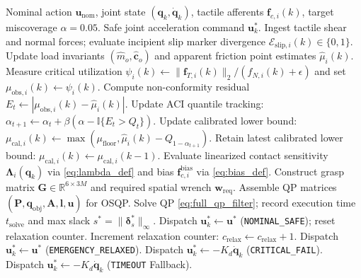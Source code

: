 \begin{algorithm}[t]
\caption{Predictive Safety Filter Execution Loop ($100\text{ Hz}$)}
\label{alg:safety_filter}
\begin{algorithmic}[1]
\REQUIRE Nominal action $\mathbf{u}_{\text{nom}}$, joint state $(\mathbf{q}_k, \dot{\mathbf{q}}_k)$, tactile afferents $\mathbf{f}_{c, i}(k)$, target miscoverage $\alpha = 0.05$.
\ENSURE Safe joint acceleration command $\mathbf{u}_k^*$.
\STATE Ingest tactile shear and normal forces; evaluate incipient slip marker divergence $\mathcal{E}_{\text{slip}, i}(k) \in \{0, 1\}$.
\STATE Update load invariants $(\hat{m}_o, \hat{\mathbf{c}}_o)$ and apparent friction point estimates $\hat{\mu}_i(k)$.
    \STATE Measure critical utilization $\psi_i(k) \leftarrow \|\mathbf{f}_{T, i}(k)\|_2 / (f_{N, i}(k) + \epsilon)$ and set $\mu_{\text{obs}, i}(k) \leftarrow \psi_i(k)$.
    \STATE Compute non-conformity residual $E_t \leftarrow |\mu_{\text{obs}, i}(k) - \hat{\mu}_i(k)|$.
    \STATE Update ACI quantile tracking: $\alpha_{t+1} \leftarrow \alpha_t + \beta (\alpha - \mathbb{I}\{E_t > Q_t\})$.
    \STATE Update calibrated lower bound: $\mu_{\text{cal}, i}(k) \leftarrow \max(\mu_{\text{floor}}, \hat{\mu}_i(k) - Q_{1 - \alpha_{t+1}})$.
\ELSE
    \STATE Retain latest calibrated lower bound: $\mu_{\text{cal}, i}(k) \leftarrow \mu_{\text{cal}, i}(k-1)$.
\ENDIF
\STATE Evaluate linearized contact sensitivity $\mathbf{\Lambda}_i(\mathbf{q}_k)$ via \eqref{eq:lambda_def} and bias $\mathbf{f}_{c, i}^{\text{bias}}$ via \eqref{eq:bias_def}.
\STATE Construct grasp matrix $\mathbf{G} \in \mathbb{R}^{6 \times 3M}$ and required spatial wrench $\mathbf{w}_{\text{req}}$.
\STATE Assemble QP matrices $(\mathbf{P}, \mathbf{q}_{\text{obj}}, \mathbf{A}, \mathbf{l}, \mathbf{u})$ for OSQP.
\STATE Solve QP \eqref{eq:full_qp_filter}; record execution time $t_{\text{solve}}$ and max slack $s^* = \|\boldsymbol{\delta}_s^*\|_\infty$.
    \STATE Dispatch $\mathbf{u}_k^* \leftarrow \mathbf{u}^*$ (\texttt{NOMINAL\_SAFE}); reset relaxation counter.
    \STATE Increment relaxation counter: $c_{\text{relax}} \leftarrow c_{\text{relax}} + 1$.
        \STATE Dispatch $\mathbf{u}_k^* \leftarrow \mathbf{u}^*$ (\texttt{EMERGENCY\_RELAXED}).
    \ELSE
        \STATE Dispatch $\mathbf{u}_k^* \leftarrow -K_d \dot{\mathbf{q}}_k$ (\texttt{CRITICAL\_FAIL}).
    \ENDIF
\ELSE
    \STATE Dispatch $\mathbf{u}_k^* \leftarrow -K_d \dot{\mathbf{q}}_k$ (\texttt{TIMEOUT} Fallback).
\ENDIF
\end{algorithmic}
\end{algorithm}

